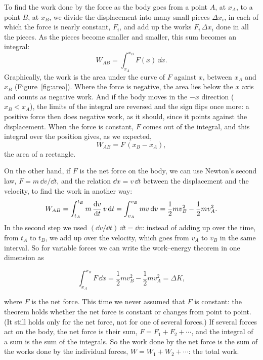 \documentclass[11pt,a4paper]{article}
\begin{document}
To find the work done by the force as the body goes from a point $A$, at $x_A$, to a point $B$, at
$x_B$, we divide the displacement into many small pieces $\Delta x_i$, in each of which the force is
nearly constant, $F_i$, and add up the works $F_i\,\Delta x_i$ done in all the pieces. As the pieces
become smaller and smaller, this sum becomes an integral:
\begin{equation}\label{eq:W-int}
  W_{AB} = \int_{x_A}^{x_B} F(x)\,\dd x .
\end{equation}
Graphically, the work is the area under the curve of $F$ against $x$, between $x_A$ and $x_B$
(Figure~\ref{fig:area}). Where the force is negative, the area lies below the $x$ axis and counts as
negative work. And if the body moves in the $-x$ direction ($x_B < x_A$), the limits of the integral
are reversed and the sign flips once more: a positive force then does negative work, as it should,
since it points against the displacement. When the force is constant, $F$ comes out of the integral,
and this integral over the position gives, as we expected,
\begin{equation}\label{eq:W-const}
  W_{AB} = F\,(x_B - x_A) ,
\end{equation}
the area of a rectangle.

On the other hand, if $F$ is the net force on the body, we can use Newton's second law,
$F = m\,\dd v/\dd t$, and the relation $\dd x = v\,\dd t$ between the displacement and the velocity,
to find the work in another way:
\begin{equation}\label{eq:W-n2}
  W_{AB} = \int_{t_A}^{t_B} m\,\frac{\mathrm{d} v}{\mathrm{d} t}\,v\,\mathrm{d} t = \int_{v_A}^{v_B} mv\,\mathrm{d} v
         = \frac12 mv_B^2 - \frac12 mv_A^2 .
\end{equation}
In the second step we used $(\dd v/\dd t)\,\dd t = \dd v$: instead of adding up over the time, from
$t_A$ to $t_B$, we add up over the velocity, which goes from $v_A$ to $v_B$ in the same interval. So
for variable forces we can write the work--energy theorem in one dimension as
\begin{keyresult}
\begin{equation}\label{eq:wke-1d}
  \int_{x_A}^{x_B} F\,\dd x = \frac12 mv_B^2 - \frac12 mv_A^2 = \Delta K ,
\end{equation}
\end{keyresult}
where $F$ is the net force. This time we never assumed that $F$ is constant: the theorem holds
whether the net force is constant or changes from point to point. (It still holds only for the net
force, not for one of several forces.) If several forces act on the body, the net force is their sum, $F = F_1 + F_2 + \cdots$,
and the integral of a sum is the sum of the integrals. So the work done by the net force is the sum of
the works done by the individual forces, $W = W_1 + W_2 + \cdots$: the total work.
\end{document}
